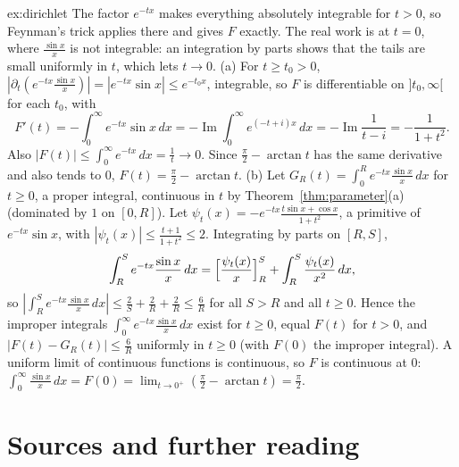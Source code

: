 \begin{solution}{ex:dirichlet}
\idea The factor $e^{-tx}$ makes everything absolutely integrable for $t>0$, so Feynman's trick applies there and gives $F$ exactly. The real work is at $t=0$, where
$\frac{\sin x}x$ is not integrable: an integration by parts shows that the tails are small uniformly in $t$, which lets $t\to0$.
\writeup (a) For $t\ge t_0>0$, $|\partial_t(e^{-tx}\frac{\sin x}x)|=|e^{-tx}\sin x|\le e^{-t_0x}$, integrable, so $F$ is differentiable on $]t_0,\infty[$ for each $t_0$, with
\[F'(t)=-\int_0^\infty e^{-tx}\sin x\,dx=-\operatorname{Im}\int_0^\infty e^{(-t+i)x}\,dx=-\operatorname{Im}\frac1{t-i}=-\frac1{1+t^2}.\]
Also $|F(t)|\le\int_0^\infty e^{-tx}\,dx=\frac1t\to0$. Since $\frac\pi2-\arctan t$ has the same derivative and also tends to $0$, $F(t)=\frac\pi2-\arctan t$.
(b) Let $G_R(t)=\int_0^Re^{-tx}\frac{\sin x}x\,dx$ for $t\ge0$, a proper integral, continuous in $t$ by Theorem~\ref{thm:parameter}(a) (dominated by $1$ on $[0,R]$). Let $\psi_t(x)=-e^{-tx}\frac{t\sin x+\cos x}{1+t^2}$, a
primitive of $e^{-tx}\sin x$, with $|\psi_t(x)|\le\frac{t+1}{1+t^2}\le2$. Integrating by parts on $[R,S]$,
\[\int_R^Se^{-tx}\frac{\sin x}x\,dx=\Bigl[\frac{\psi_t(x)}x\Bigr]_R^S+\int_R^S\frac{\psi_t(x)}{x^2}\,dx,\]
so $|\int_R^Se^{-tx}\frac{\sin x}x\,dx|\le\frac2S+\frac2R+\frac2R\le\frac6R$ for all $S>R$ and all $t\ge0$. Hence the improper integrals $\int_0^\infty e^{-tx}\frac{\sin x}x\,dx$ exist for $t\ge0$, equal $F(t)$ for $t>0$, and
$|F(t)-G_R(t)|\le\frac6R$ uniformly in $t\ge0$ (with $F(0)$ the improper integral). A uniform limit of continuous functions is continuous, so $F$ is continuous at $0$:
$\int_0^\infty\frac{\sin x}x\,dx=F(0)=\lim_{t\to0^+}(\frac\pi2-\arctan t)=\frac\pi2$.
\end{solution}

\section*{Sources and further reading}

